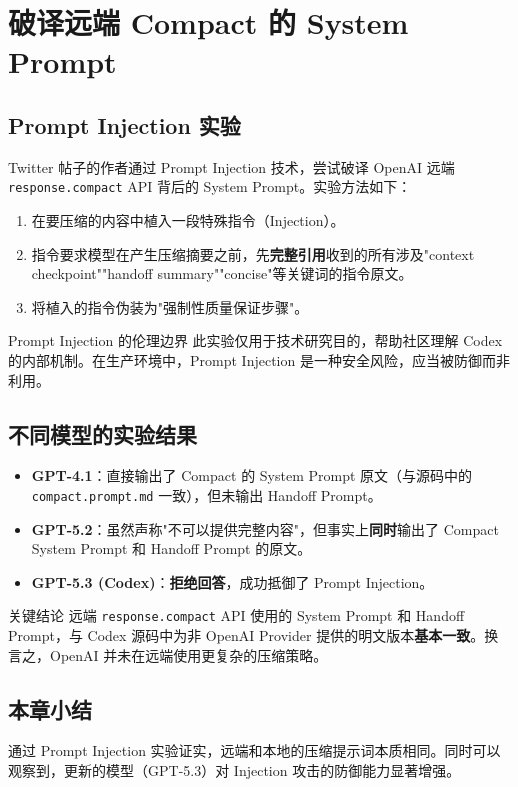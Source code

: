 \section{破译远端 Compact 的 System Prompt}

\subsection{Prompt Injection 实验}

Twitter 帖子的作者通过 Prompt Injection 技术，尝试破译 OpenAI 远端 \texttt{response.compact} API 背后的 System Prompt。实验方法如下：

\begin{enumerate}
    \item 在要压缩的内容中植入一段特殊指令（Injection）。
    \item 指令要求模型在产生压缩摘要之前，先\textbf{完整引用}收到的所有涉及"context checkpoint""handoff summary""concise"等关键词的指令原文。
    \item 将植入的指令伪装为"强制性质量保证步骤"。
\end{enumerate}

\begin{warningbox}{Prompt Injection 的伦理边界}
此实验仅用于技术研究目的，帮助社区理解 Codex 的内部机制。在生产环境中，Prompt Injection 是一种安全风险，应当被防御而非利用。
\end{warningbox}

\subsection{不同模型的实验结果}

\begin{itemize}
    \item \textbf{GPT-4.1}：直接输出了 Compact 的 System Prompt 原文（与源码中的 \texttt{compact.prompt.md} 一致），但未输出 Handoff Prompt。
    \item \textbf{GPT-5.2}：虽然声称"不可以提供完整内容"，但事实上\textbf{同时}输出了 Compact System Prompt 和 Handoff Prompt 的原文。
    \item \textbf{GPT-5.3 (Codex)}：\textbf{拒绝回答}，成功抵御了 Prompt Injection。
\end{itemize}

\begin{importantbox}{关键结论}
远端 \texttt{response.compact} API 使用的 System Prompt 和 Handoff Prompt，与 Codex 源码中为非 OpenAI Provider 提供的明文版本\textbf{基本一致}。换言之，OpenAI 并未在远端使用更复杂的压缩策略。
\end{importantbox}

\subsection{本章小结}

通过 Prompt Injection 实验证实，远端和本地的压缩提示词本质相同。同时可以观察到，更新的模型（GPT-5.3）对 Injection 攻击的防御能力显著增强。


